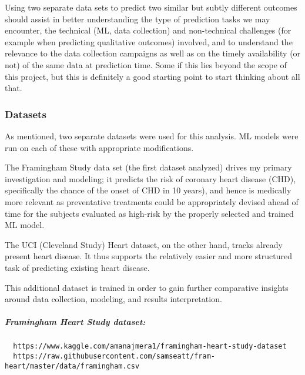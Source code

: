 \documentclass[]{article}
\let\oldsubparagraph\subparagraph
\renewcommand{\subparagraph}[1]{\oldsubparagraph{#1}\mbox{}}
\begin{document}
Using two separate data sets to predict two similar but subtly different
outcomes should assist in better understanding the type of prediction
tasks we may encounter, the technical (ML, data collection) and
non-technical challenges (for example when predicting qualitative
outcomes) involved, and to understand the relevance to the data
collection campaigns as well as on the timely availability (or not) of
the same data at prediction time. Some if this lies beyond the scope of
this project, but this is definitely a good starting point to start
thinking about all that.

\subsubsection{Datasets}\label{datasets}

As mentioned, two separate datasets were used for this analysis. ML
models were run on each of these with appropriate modifications.

The Framingham Study data set (the first dataset analyzed) drives my
primary investigation and modeling; it predicts the risk of coronary
heart disease (CHD), specifically the chance of the onset of CHD in 10
years), and hence is medically more relevant as preventative treatments
could be appropriately devised ahead of time for the subjects evaluated
as high-risk by the properly selected and trained ML model.

The UCI (Cleveland Study) Heart dataset, on the other hand, tracks
already present heart disease. It thus supports the relatively easier
and more structured task of predicting existing heart disease.

This additional dataset is trained in order to gain further comparative
insights around data collection, modeling, and results interpretation.

\subparagraph{Framingham Heart Study
dataset:}\label{framingham-heart-study-dataset}

\begin{verbatim}
  https://www.kaggle.com/amanajmera1/framingham-heart-study-dataset
  https://raw.githubusercontent.com/samseatt/fram-heart/master/data/framingham.csv
\end{verbatim}
\end{document}
